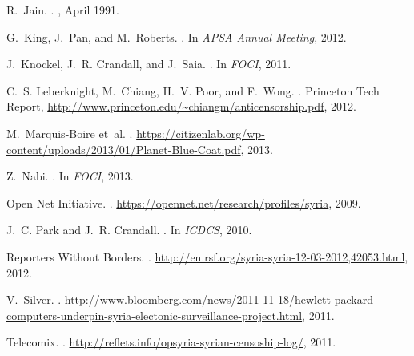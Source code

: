 \documentclass{sig-alternate-2013}
\begin{document}
\begin{thebibliography}{10}
R.~Jain.
.
, April 1991.

G.~King, J.~Pan, and M.~Roberts.
.
\newblock In {\em APSA Annual Meeting}, 2012.

J.~Knockel, J.~R. Crandall, and J.~Saia.
.
\newblock In {\em FOCI}, 2011.

C.~S. Leberknight, M.~Chiang, H.~V. Poor, and F.~Wong.
.
\newblock Princeton Tech Report,
  \url{http://www.princeton.edu/~chiangm/anticensorship.pdf}, 2012.

M.~Marquis-Boire et~al.
.
\newblock
  \url{https://citizenlab.org/wp-content/uploads/2013/01/Planet-Blue-Coat.pdf},
  2013.

Z.~Nabi.
.
\newblock In {\em FOCI}, 2013.

{Open Net Initiative}.
.
\newblock \url{https://opennet.net/research/profiles/syria}, 2009.

J.~C. Park and J.~R. Crandall.
.
\newblock In {\em ICDCS}, 2010.

{Reporters Without Borders}.
.
\newblock \url{http://en.rsf.org/syria-syria-12-03-2012,42053.html}, 2012.

V.~Silver.
.
\newblock
  \url{http://www.bloomberg.com/news/2011-11-18/hewlett-packard-computers-underpin-syria-electonic-surveillance-project.html},
  2011.

Telecomix.
.
\newblock \url{http://reflets.info/opsyria-syrian-censoship-log/}, 2011.


\end{thebibliography}
\end{document}
